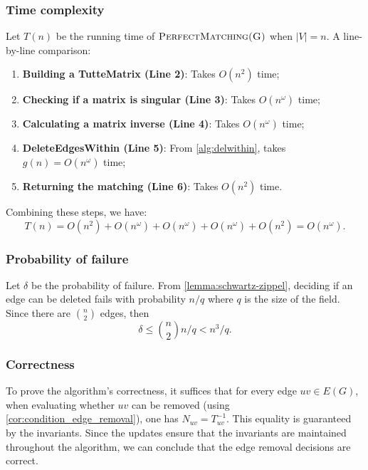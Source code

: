 \subsubsection{Time complexity}
\noindent
Let \(T(n)\) be the running time of \(\textsc{PerfectMatching(G)}\) when \(|V| = n\). 
A line-by-line comparison:
\begin{enumerate}
  \item \textbf{Building a TutteMatrix (Line 2)}: Takes \(O(n^2)\) time;
  \item \textbf{Checking if a matrix is singular (Line 3)}: Takes \(O(n^\omega)\) time;
  \item \textbf{Calculating a matrix inverse (Line 4)}: Takes \(O(n^\omega)\) time;
  \item \textbf{DeleteEdgesWithin (Line 5)}: From \eqref{alg:delwithin}, takes \(g(n) = O(n^\omega)\) time;
  \item \textbf{Returning the matching (Line 6)}: Takes \(O(n^2)\) time.
\end{enumerate}
Combining these steps, we have:
\begin{equation}
\label{alg:harvey_complexity}
    T(n) = O(n^2) + O(n^\omega) + O(n^\omega) + O(n^\omega) + O(n^2) = O(n^\omega).
\end{equation}

\subsubsection{Probability of failure}
\noindent
Let \(\delta\) be the probability of failure.
From \cref{lemma:schwartz-zippel}, deciding if an edge can be deleted fails with probability \(n / q\) where \(q\) is the size of the field. 
Since there are \(\binom{n}{2}\) edges, then 
\[
  \delta \leq \binom{n}{2} n / q < n^3 / q.
\]

\subsubsection{Correctness}
\noindent
To prove the algorithm's correctness, it suffices that for every edge \(uv \in E(G)\), when evaluating whether \(uv\) can be removed (using \cref{cor:condition_edge_removal}), one has \(N_{uv} = T^{-1}_{uv}\).
This equality is guaranteed by the invariants.
Since the updates ensure that the invariants are maintained throughout the algorithm, we can conclude that the edge removal decisions are correct.

